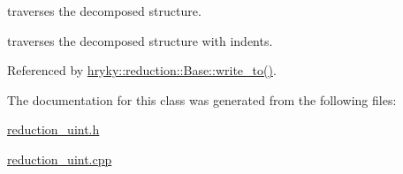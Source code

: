 traverses the decomposed structure. 

traverses the decomposed structure with indents. 

Referenced by \hyperlink{classhryky_1_1reduction_1_1_base_a709cc7c48e1c90fe253739e46d82aa19}{hryky\-::reduction\-::\-Base\-::write\-\_\-to()}.



The documentation for this class was generated from the following files\-:\begin{DoxyCompactItemize}
\item 
\hyperlink{reduction__uint_8h}{reduction\-\_\-uint.\-h}\item 
\hyperlink{reduction__uint_8cpp}{reduction\-\_\-uint.\-cpp}\end{DoxyCompactItemize}
